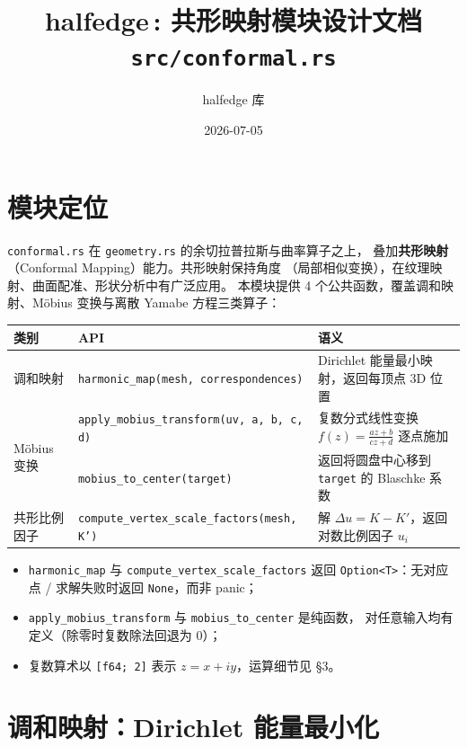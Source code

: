 \documentclass[11pt,a4paper]{article}
\title{\textbf{halfedge\,: 共形映射模块设计文档} \\ \large \texttt{src/conformal.rs}}
\author{halfedge 库}
\date{2026-07-05}
\begin{document}
\maketitle
\tableofcontents

\section{模块定位}

\texttt{conformal.rs} 在 \texttt{geometry.rs} 的余切拉普拉斯与曲率算子之上，
叠加\textbf{共形映射}（Conformal Mapping）能力。共形映射保持角度
（局部相似变换），在纹理映射、曲面配准、形状分析中有广泛应用。
本模块提供 4 个公共函数，覆盖调和映射、Möbius 变换与离散 Yamabe 方程三类算子：

\begin{center}
\renewcommand{\arraystretch}{1.18}
\begin{tabular}{@{}lll@{}}
  \toprule
  \textbf{类别} & \textbf{API} & \textbf{语义} \\
  \midrule
  \multirow{1}{*}{调和映射}
    & \texttt{harmonic\_map(mesh, correspondences)} & Dirichlet 能量最小映射，返回每顶点 3D 位置 \\
  \midrule
  \multirow{2}{*}{Möbius 变换}
    & \texttt{apply\_mobius\_transform(uv, a, b, c, d)} & 复数分式线性变换 $f(z)=\frac{az+b}{cz+d}$ 逐点施加 \\
    & \texttt{mobius\_to\_center(target)}              & 返回将圆盘中心移到 \texttt{target} 的 Blaschke 系数 \\
  \midrule
  \multirow{1}{*}{共形比例因子}
    & \texttt{compute\_vertex\_scale\_factors(mesh, K')} & 解 $\Delta u = K - K'$，返回对数比例因子 $u_i$ \\
  \bottomrule
\end{tabular}
\end{center}

\begin{itemize}
  \item \texttt{harmonic\_map} 与 \texttt{compute\_vertex\_scale\_factors} 返回
        \texttt{Option<T>}：无对应点 / 求解失败时返回 \texttt{None}，而非 panic；
  \item \texttt{apply\_mobius\_transform} 与 \texttt{mobius\_to\_center} 是纯函数，
        对任意输入均有定义（除零时复数除法回退为 $0$）；
  \item 复数算术以 \texttt{[f64; 2]} 表示 $z = x + iy$，运算细节见 \S 3。
\end{itemize}

\section{调和映射：Dirichlet 能量最小化}
\end{document}
